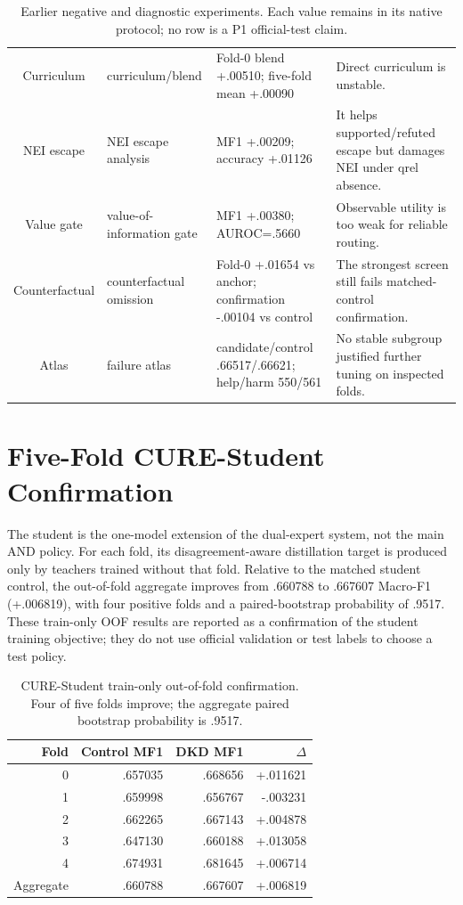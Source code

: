 \documentclass[11pt]{article}
\begin{document}
\begin{table}[t]
{\begin{tabular}{@{}clp{4.9cm}p{5.2cm}@{}}
Curriculum & curriculum/blend & Fold-0 blend +.00510; five-fold mean +.00090 & Direct curriculum is unstable.\\
NEI escape & NEI escape analysis & MF1 +.00209; accuracy +.01126 & It helps supported/refuted escape but damages NEI under qrel absence.\\
Value gate & value-of-information gate & MF1 +.00380; AUROC=.5660 & Observable utility is too weak for reliable routing.\\
Counterfactual & counterfactual omission & Fold-0 +.01654 vs anchor; confirmation -.00104 vs control & The strongest screen still fails matched-control confirmation.\\
Atlas & failure atlas & candidate/control .66517/.66621; help/harm 550/561 & No stable subgroup justified further tuning on inspected folds.\\
\bottomrule
\end{tabular}}
\caption{Earlier negative and diagnostic experiments. Each value remains in its native protocol; no row is a P1 official-test claim.}\label{tab:ledger-appendix}
\end{table}

\section{Five-Fold \textsc{CURE}-Student Confirmation}
The student is the one-model extension of the dual-expert system, not the main AND policy. For each fold, its disagreement-aware distillation target is produced only by teachers trained without that fold. Relative to the matched student control, the out-of-fold aggregate improves from .660788 to .667607 Macro-F1 (+.006819), with four positive folds and a paired-bootstrap probability of .9517. These train-only OOF results are reported as a confirmation of the student training objective; they do not use official validation or test labels to choose a test policy.

\begin{table}[H]
\centering\scriptsize
\begin{tabular}{@{}rrrr@{}}
\toprule
Fold & Control MF1 & DKD MF1 & $\Delta$\\
\midrule
0 & .657035 & .668656 & +.011621\\
1 & .659998 & .656767 & -.003231\\
2 & .662265 & .667143 & +.004878\\
3 & .647130 & .660188 & +.013058\\
4 & .674931 & .681645 & +.006714\\
\midrule
Aggregate & .660788 & .667607 & +.006819\\
\bottomrule
\end{tabular}
\caption{\textsc{CURE}-Student train-only out-of-fold confirmation. Four of five folds improve; the aggregate paired bootstrap probability is .9517.}\label{tab:b19-folds}
\end{table}
\end{document}
